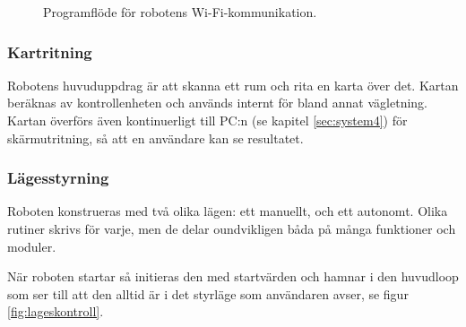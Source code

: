 \documentclass[a4paper,11pt]{article}
\begin{document}
\begin{figure}[h!]
\begin{tikzpicture}[node distance=2cm,scale=0.6, every node/.style={scale=0.6}]
    \end{tikzpicture}
    \caption{Programflöde för robotens Wi-Fi-kommunikation.}
    \label{fig:wifi}
\end{figure}

\subsubsection{Kartritning} \label{sssec:mapping}
Robotens huvuduppdrag är att skanna ett rum och rita en karta över det. Kartan beräknas av kontrollenheten och används internt för bland annat vägletning. Kartan överförs även kontinuerligt till PC:n (se kapitel \ref{sec:system4}) för skärmutritning, så att en användare kan se resultatet.

\clearpage

\subsubsection{Lägesstyrning}
Roboten konstrueras med två olika lägen: ett manuellt, och ett autonomt. Olika rutiner skrivs för varje, men de delar oundvikligen båda på många funktioner och moduler.

När roboten startar så initieras den med startvärden och hamnar i den huvudloop som ser till att den alltid är i det styrläge som användaren avser, se figur \ref{fig:lageskontroll}.
\end{document}
